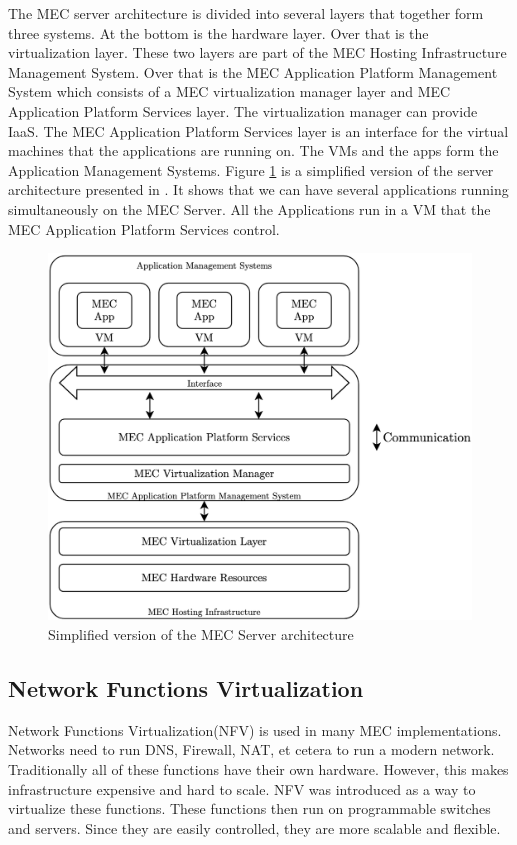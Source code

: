 The MEC server architecture is divided into several layers that together form three systems\cite{patel_mec_nodate}. At the bottom is the hardware layer. Over that is the virtualization layer. These two layers are part of the MEC Hosting Infrastructure Management System. Over that is the MEC Application Platform Management System which consists of a MEC virtualization manager layer and MEC Application Platform Services layer. The virtualization manager can provide IaaS. The MEC Application Platform Services layer is an interface for the virtual machines that the applications are running on. The VMs and the apps form the Application Management Systems. Figure \ref{fig:MEC_Server} is a simplified version of the server architecture presented in \cite{patel_mec_nodate}. It shows that we can have several applications running simultaneously on the MEC Server. All the Applications run in a VM that the MEC Application Platform Services control.
\begin{figure}[t]
    \centering
    \includegraphics[scale=0.3]{chapters/4_architectures/figures/MEC_server_screenshot.png}
    \caption{Simplified version of the MEC Server architecture}
    \label{fig:MEC_Server}
\end{figure}

\subsection{Network Functions Virtualization}
Network Functions Virtualization(NFV) is used in many MEC implementations\cite{patel_mec_nodate}. Networks need to run DNS, Firewall, NAT, et cetera to run a modern network. Traditionally all of these functions have their own hardware. However, this makes infrastructure expensive and hard to scale. NFV was introduced as a way to virtualize these functions. These functions then run on programmable switches and servers. Since they are easily controlled, they are more scalable and flexible.

